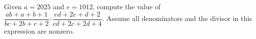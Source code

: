 Given $a=2025$ and $e=1012$, compute the value of $\dfrac{ab+a+b+1}{bc+2b+c+2}:\dfrac{ed+2e+d+2}{cd+2c+2d+4}$.  Assume all denominators and the divisor in this expression are nonzero.
